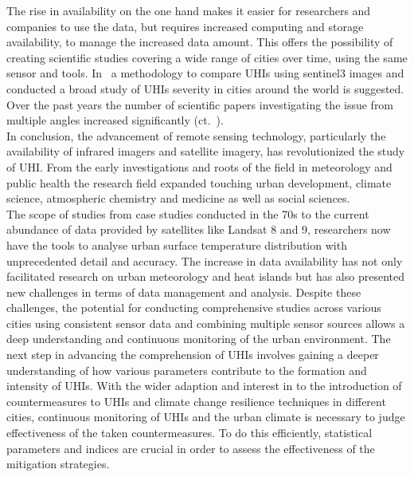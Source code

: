 \documentclass[12pt,a4paper, english,twoside]{article}
\begin{document}
  The rise in availability on the one hand makes it easier for researchers and companies to use the data, but requires increased computing and storage availability, to manage the increased data amount.
  This offers the possibility of creating scientific studies covering a wide range of cities over time, using the same sensor and tools. 
  In~\cite{Sobrino2020} a methodology to compare \glspl{UHI} using \gls{sentinel3} images and conducted a broad study of \glspl{UHI} severity in cities around the world is suggested.
  Over the past years the number of scientific papers investigating the issue from multiple angles increased significantly (ct.~\cite[P. 3]{Piracha2022b}).\\
  In conclusion, the advancement of remote sensing technology, particularly the availability of infrared imagers and satellite imagery, has revolutionized the study of \gls{UHI}. 
  From the early investigations and roots of the field in meteorology and public health the research field expanded touching urban development, climate science, atmospheric chemistry and medicine as well as social sciences.\\
  The scope of studies from case studies conducted in the 70s to the current abundance of data provided by satellites like Landsat 8 and 9, researchers now have the tools to analyse urban surface temperature distribution with unprecedented detail and accuracy.
  The increase in data availability has not only facilitated research on urban meteorology and heat islands but has also presented new challenges in terms of data management and analysis.
  Despite these challenges, the potential for conducting comprehensive studies across various cities using consistent sensor data and combining multiple sensor sources allows a deep understanding and continuous monitoring of the urban environment.
  The next step in advancing the comprehension of \glspl{UHI} involves gaining a deeper understanding of how various parameters contribute to the formation and intensity of \glspl{UHI}.
  With the wider adaption and interest in to the introduction of countermeasures to \glspl{UHI} and climate change resilience techniques in different cities, continuous monitoring of \glspl{UHI} and the urban climate is necessary to judge effectiveness of the taken countermeasures. 
  To do this efficiently, statistical parameters and indices are crucial in order to assess the effectiveness of the mitigation strategies. 
\end{document}
